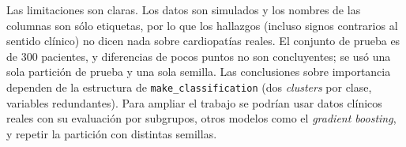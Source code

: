 \documentclass[11pt,letterpaper]{article}
\begin{document}
Las limitaciones son claras. Los datos son simulados y los nombres de las columnas son sólo etiquetas, por lo que los hallazgos (incluso signos contrarios al sentido clínico) no dicen nada sobre cardiopatías reales. El conjunto de prueba es de 300 pacientes, y diferencias de pocos puntos no son concluyentes; se usó una sola partición de prueba y una sola semilla. Las conclusiones sobre importancia dependen de la estructura de \texttt{make\_classification} (dos \textit{clusters} por clase, variables redundantes). Para ampliar el trabajo se podrían usar datos clínicos reales con su evaluación por subgrupos, otros modelos como el \textit{gradient boosting}, y repetir la partición con distintas semillas.

\end{document}
